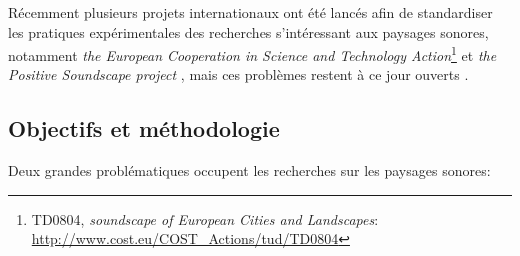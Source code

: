 Récemment plusieurs projets internationaux ont été lancés afin de standardiser les pratiques expérimentales des recherches s’intéressant aux paysages sonores, notamment \emph{ the European Cooperation in Science and Technology Action}\footnote{TD0804, \emph{soundscape of European Cities and Landscapes}: \url{http://www.cost.eu/COST_Actions/tud/TD0804}} \citep{schulte2010soundscape} et \emph{the Positive Soundscape project} \citep{salford2106,davies2013perception}, mais ces problèmes restent à ce jour ouverts \citep{schulte2013soundscape,ribeiro2013heart}.

\subsection{Objectifs et méthodologie}

Deux grandes problématiques occupent les recherches sur les paysages sonores:

